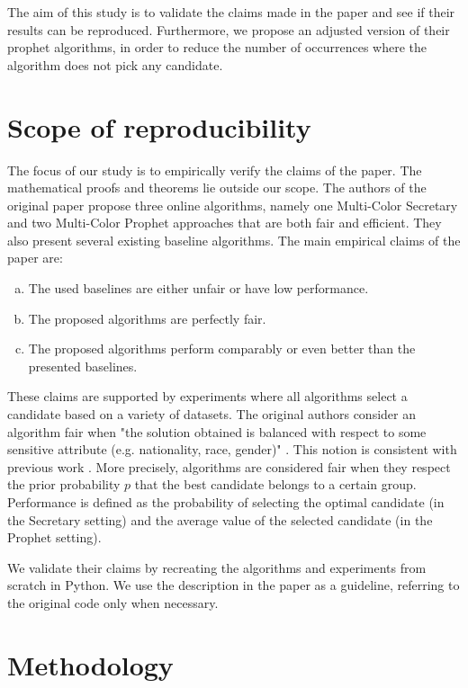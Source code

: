 The aim of this study is to validate the claims made in the paper and see if their results can be reproduced. Furthermore, we propose an adjusted version of their prophet algorithms, in order to reduce the number of occurrences where the algorithm does not pick any candidate.

\section{Scope of reproducibility}
\label{sec:claims}
The focus of our study is to empirically verify the claims of the paper. The mathematical proofs and theorems lie outside our scope. The authors of the original paper propose three online algorithms, namely one Multi-Color Secretary and two Multi-Color Prophet approaches that are both fair and efficient. They also present several existing baseline algorithms. The main empirical claims of the paper are:

\begin{enumerate}[a)]
    \item The used baselines are either unfair or have low performance.
    \item The proposed algorithms are perfectly fair.
    \item The proposed algorithms perform comparably or even better than the presented baselines.
\end{enumerate}


These claims are supported by experiments where all algorithms select a candidate based on a variety of datasets. The original authors consider an algorithm fair when "the solution obtained is balanced with respect to some sensitive attribute (e.g. nationality, race, gender)" \cite{correa21}. This notion is consistent with previous work \cite{ Celis_a, Celis_b, Celis_c, Chierichetti2017,Chierichetti2019, halabi}. More precisely, algorithms are considered fair when they respect the prior probability $p$ that the best candidate belongs to a certain group. Performance is defined as the probability of selecting the optimal candidate (in the Secretary setting) and the average value of the selected candidate (in the Prophet setting). 

We validate their claims by recreating the algorithms and experiments from scratch in Python. We use the description in the paper as a guideline, referring to the original code only when necessary.

\section{Methodology}

